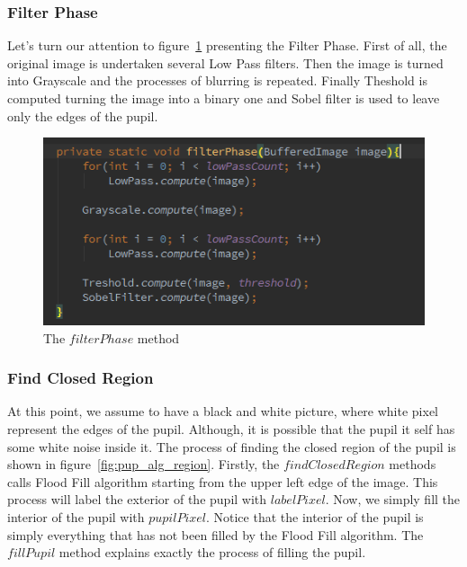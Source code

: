 \documentclass{article}
\begin{document}
\subsubsection{Filter Phase}
Let's turn our attention to figure~\ref{fig:pup_alg_filter} presenting the Filter Phase. First of all, the original image is undertaken several Low Pass filters. Then the image is turned into Grayscale and the processes of blurring is repeated. Finally Theshold is computed turning the image into a binary one and Sobel filter is used to leave only the edges of the pupil.

%
%
\begin{figure}[H]
\centering

  \includegraphics[width=0.9\linewidth]{res/pupil/alg/filterPhase.png}

\caption{The $filterPhase$ method}
\label{fig:pup_alg_filter}
\end{figure}

\subsubsection{Find Closed Region}
At this point, we assume to have a black and white picture, where white pixel represent the edges of the pupil. Although, it is possible that the pupil it self has some white noise inside it. The process of finding the closed region of the pupil is shown in figure~\ref{fig:pup_alg_region}. Firstly, the $findClosedRegion$ methods calls Flood Fill algorithm starting from the upper left edge of the image. This process will label the exterior of the pupil with $labelPixel$. Now, we simply fill the interior of the pupil with $pupilPixel$. Notice that the interior of the pupil is simply everything that has not been filled by the Flood Fill algorithm. The $fillPupil$ method explains exactly the process of filling the pupil.
\end{document}
